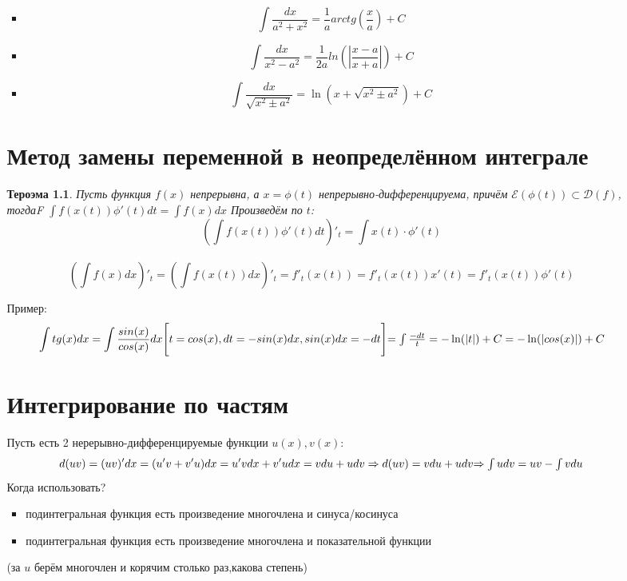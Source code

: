 \documentclass[oneside]{book}
\newtheorem{thm}{Тероэма}[chapter] %
\begin{document}
\begin{enumerate}
\begin{itemize}
\begin{enumerate}
\begin{itemize}
\begin{equation}
  \end{equation}
  \item \begin{equation}
    \int \frac{dx}{a^2 + x^2} = \frac{1}{a}arctg(\frac{x}{a}) + C
  \end{equation}
  \item \begin{equation}
    \int \frac{dx}{x^2 - a^2} = \frac{1}{2a}ln(|\frac{x - a}{x + a}|) + C
  \end{equation}
  \item \begin{equation}
    \int \frac{dx}{\sqrt{x^2 \pm a^2}} = \ln(x + \sqrt{x^2 \pm a^2}) + C
  \end{equation}
\end{itemize}
\setcounter{chapter}{32}
\chapter[Замен переменной]{Метод замены переменной в неопределённом интеграле}
\begin{thm}
  Пусть функция $f(x)$ непрерывна, а $x = \phi(t)$ непрерывно-дифференцируема, причём $\mathcal{E}(\phi(t)) \subset \mathcal{D}(f)$, тогдаF
  $\int f(x(t)) \phi'(t) dt = \int f(x) dx$ Произведём по $t$: $$
  (\int f(x(t)) \phi'(t) dt)'_t = \int x(t) \cdot \phi'(t) $$\\$$
  (\int f(x) dx)'_t = (\int f(x(t))dx)'_t = f'_t(x(t)) = f'_t(x(t))x'(t) = f'_t(x(t))\phi'(t)
  $$
\end{thm}
Пример:
\begin{equation}
  \int tg(x)dx = \int \frac{sin(x)}{cos(x)}dx \\
  \Bigg[t = cos(x), dt = -sin(x)dx, sin(x)dx = -dt \Bigg] $$\\$$ =
  \int \frac{-dt}{t} = -\ln(|t|)+C = -\ln(|cos(x)|) + C
\end{equation}
\setcounter{chapter}{33}
\chapter{Интегрирование по частям}
Пусть есть 2 нерерывно-дифференцируемые функции $u(x), v(x)$: \begin{equation}
  d(uv) = (uv)'dx = (u'v + v'u)dx = u'vdx + v'udx = vdu + udv \Rightarrow d(uv) = vdu + udv
  $\\$ \Rightarrow \int udv = uv - \int vdu
\end{equation}
Когда использовать?

\begin{itemize}
  \item подинтегральная функция есть произведение многочлена и синуса/косинуса
  \item подинтегральная функция есть произведение многочлена и показательной функции
\end{itemize}
(за $u$ берём многочлен и корячим столько раз,какова степень)


\end{enumerate}
\end{itemize}
\end{enumerate}
\end{document}
